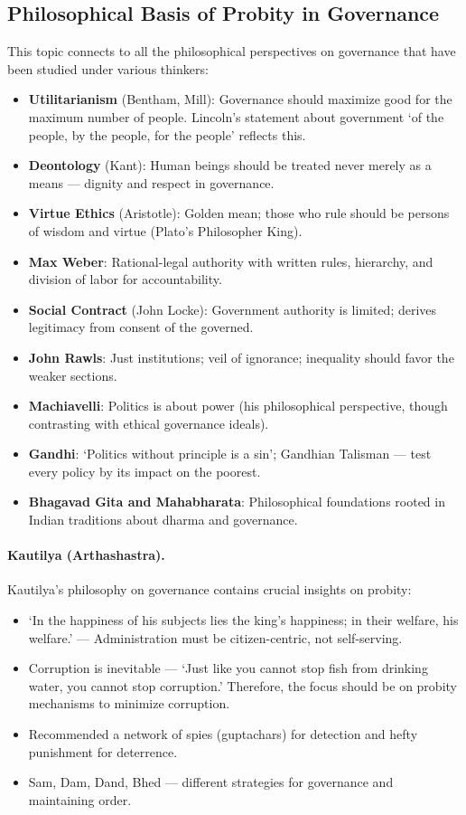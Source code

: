 \subsection{Philosophical Basis of Probity in Governance}
This topic connects to all the philosophical perspectives on governance that have been studied under various thinkers:
\begin{itemize}
\item \textbf{Utilitarianism} (Bentham, Mill): Governance should maximize good for the maximum number of people. Lincoln's statement about government `of the people, by the people, for the people' reflects this.
\item \textbf{Deontology} (Kant): Human beings should be treated never merely as a means --- dignity and respect in governance.
\item \textbf{Virtue Ethics} (Aristotle): Golden mean; those who rule should be persons of wisdom and virtue (Plato's Philosopher King).
\item \textbf{Max Weber}: Rational-legal authority with written rules, hierarchy, and division of labor for accountability.
\item \textbf{Social Contract} (John Locke): Government authority is limited; derives legitimacy from consent of the governed.
\item \textbf{John Rawls}: Just institutions; veil of ignorance; inequality should favor the weaker sections.
\item \textbf{Machiavelli}: Politics is about power (his philosophical perspective, though contrasting with ethical governance ideals).
\item \textbf{Gandhi}: `Politics without principle is a sin'; Gandhian Talisman --- test every policy by its impact on the poorest.
\item \textbf{Bhagavad Gita and Mahabharata}: Philosophical foundations rooted in Indian traditions about dharma and governance.
\end{itemize}

\paragraph{Kautilya (Arthashastra).} Kautilya's philosophy on governance contains crucial insights on probity:
\begin{itemize}
\item `In the happiness of his subjects lies the king's happiness; in their welfare, his welfare.' --- Administration must be citizen-centric, not self-serving.
\item Corruption is inevitable --- `Just like you cannot stop fish from drinking water, you cannot stop corruption.' Therefore, the focus should be on probity mechanisms to minimize corruption.
\item Recommended a network of spies (guptachars) for detection and hefty punishment for deterrence.
\item Sam, Dam, Dand, Bhed --- different strategies for governance and maintaining order.
\end{itemize}

